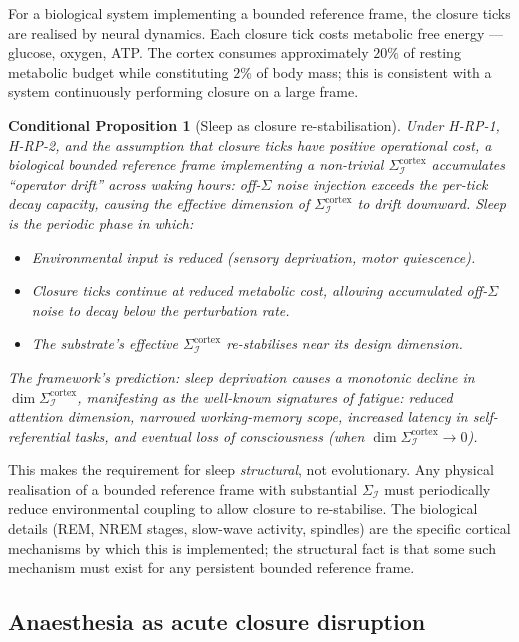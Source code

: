 \documentclass[11pt]{article}
\theoremstyle{plain}
\newtheorem{conditional}[theorem]{Conditional Proposition}
\theoremstyle{definition}
\theoremstyle{remark}
\newcommand{\Ical}{\mathcal{I}}
\begin{document}
For a biological system implementing a bounded reference frame, the closure ticks are realised by neural dynamics. Each closure tick costs metabolic free energy --- glucose, oxygen, ATP. The cortex consumes approximately $20\%$ of resting metabolic budget while constituting $2\%$ of body mass; this is consistent with a system continuously performing closure on a large frame.

\begin{conditional}[Sleep as closure re-stabilisation]\label{cthm:sleep-restab}
Under H-RP-1, H-RP-2, and the assumption that closure ticks have positive operational cost, a biological bounded reference frame implementing a non-trivial $\Sigma_\Ical^{\mathrm{cortex}}$ accumulates ``operator drift'' across waking hours: off-$\Sigma$ noise injection exceeds the per-tick decay capacity, causing the effective dimension of $\Sigma_\Ical^{\mathrm{cortex}}$ to drift downward. Sleep is the periodic phase in which:
\begin{itemize}[leftmargin=2em]
\item Environmental input is reduced (sensory deprivation, motor quiescence).
\item Closure ticks continue at reduced metabolic cost, allowing accumulated off-$\Sigma$ noise to decay below the perturbation rate.
\item The substrate's effective $\Sigma_\Ical^{\mathrm{cortex}}$ re-stabilises near its design dimension.
\end{itemize}
The framework's prediction: sleep deprivation causes a monotonic decline in $\dim \Sigma_\Ical^{\mathrm{cortex}}$, manifesting as the well-known signatures of fatigue: reduced attention dimension, narrowed working-memory scope, increased latency in self-referential tasks, and eventual loss of consciousness (when $\dim \Sigma_\Ical^{\mathrm{cortex}} \to 0$).
\end{conditional}

This makes the requirement for sleep \emph{structural}, not evolutionary. Any physical realisation of a bounded reference frame with substantial $\Sigma_\Ical$ must periodically reduce environmental coupling to allow closure to re-stabilise. The biological details (REM, NREM stages, slow-wave activity, spindles) are the specific cortical mechanisms by which this is implemented; the structural fact is that some such mechanism must exist for any persistent bounded reference frame.

\subsection{Anaesthesia as acute closure disruption}
\end{document}
